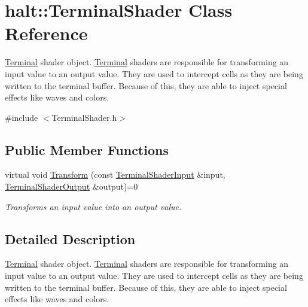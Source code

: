 \hypertarget{classhalt_1_1_terminal_shader}{\section{halt\-:\-:\-Terminal\-Shader \-Class \-Reference}
\label{classhalt_1_1_terminal_shader}
}


\hyperlink{classhalt_1_1_terminal}{\-Terminal} shader object. \hyperlink{classhalt_1_1_terminal}{\-Terminal} shaders are responsible for transforming an input value to an output value. \-They are used to intercept cells as they are being written to the terminal buffer. \-Because of this, they are able to inject special effects like waves and colors.  




{\ttfamily \#include $<$\-Terminal\-Shader.\-h$>$}

\subsection*{\-Public \-Member \-Functions}
\begin{DoxyCompactItemize}
\item 
virtual void \hyperlink{classhalt_1_1_terminal_shader_a5f76d919e392b505be7dd7c8c153e463}{\-Transform} (const \hyperlink{structhalt_1_1_terminal_shader_input}{\-Terminal\-Shader\-Input} \&input, \hyperlink{structhalt_1_1_terminal_shader_output}{\-Terminal\-Shader\-Output} \&output)=0
\begin{DoxyCompactList}\small\item\em \-Transforms an input value into an output value. \end{DoxyCompactList}\end{DoxyCompactItemize}


\subsection{\-Detailed \-Description}
\hyperlink{classhalt_1_1_terminal}{\-Terminal} shader object. \hyperlink{classhalt_1_1_terminal}{\-Terminal} shaders are responsible for transforming an input value to an output value. \-They are used to intercept cells as they are being written to the terminal buffer. \-Because of this, they are able to inject special effects like waves and colors. 

